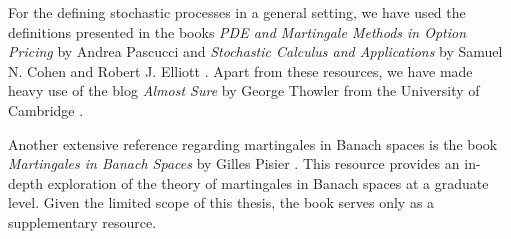 For the defining stochastic processes in a general setting, we have used the definitions presented in the books \textit{PDE and Martingale Methods in Option Pricing} by Andrea Pascucci \cite{Pascucci_2011} and \textit{Stochastic Calculus and Applications} by Samuel N. Cohen and Robert J. Elliott \cite{Elliott_Cohen_1982}. Apart from these resources, we have made heavy use of the blog \textit{Almost Sure} by George Thowler from the University of Cambridge \cite{Thowler}.

Another extensive reference regarding martingales in Banach spaces is the book \textit{Martingales in Banach Spaces} by Gilles Pisier \cite{pisier_2016}. This resource provides an in-depth exploration of the theory of martingales in Banach spaces at a graduate level. Given the limited scope of this thesis, the book serves only as a supplementary resource.
